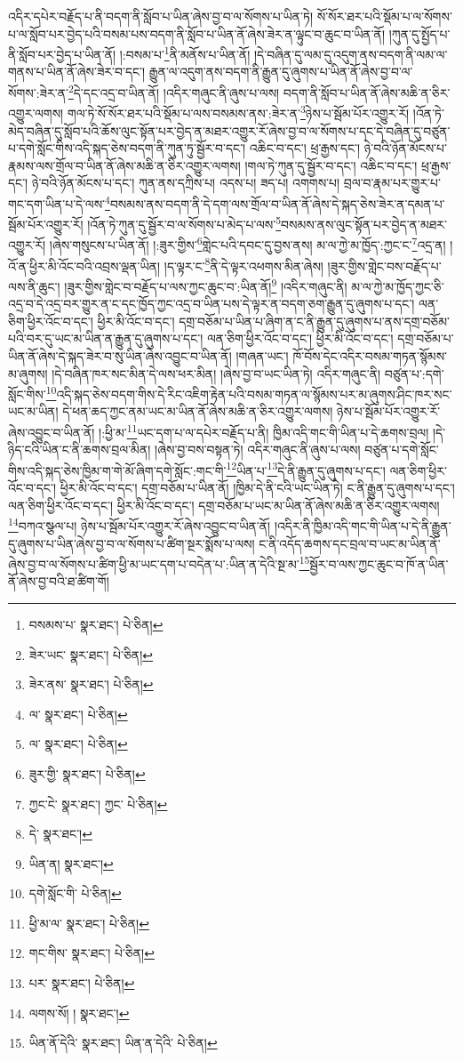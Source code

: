འདིར་དཔེར་བརྗོད་པ་ནི་བདག་ནི་སློབ་པ་ཡིན་ཞེས་བྱ་བ་ལ་སོགས་པ་ཡིན་ཏེ། སོ་སོར་ཐར་པའི་སྡོམ་པ་ལ་སོགས་པ་ལ་སློབ་པར་བྱེད་པའི་བསམ་པས་བདག་ནི་སློབ་པ་ཡིན་ནོ་ཞེས་ཟེར་ན་ལྟུང་བ་ཆུང་བ་ཡིན་ནོ། །ཀུན་དུ་སྤྱོད་པ་ནི་སློབ་པར་བྱེད་པ་ཡིན་ནོ། །:བསམ་པ་\footnote{བསམས་པ་  སྣར་ཐང་།  པེ་ཅིན། }ནི་མནོས་པ་ཡིན་ནོ། །དེ་བཞིན་དུ་ལམ་དུ་འདུག་ནས་བདག་ནི་ལམ་ལ་གནས་པ་ཡིན་ནོ་ཞེས་ཟེར་བ་དང་། རྒྱུན་ལ་འདུག་ནས་བདག་ནི་རྒྱུན་དུ་ཞུགས་པ་ཡིན་ནོ་ཞེས་བྱ་བ་ལ་སོགས་:ཟེར་ན་\footnote{ཟེར་ཡང་  སྣར་ཐང་།  པེ་ཅིན། }དེ་དང་འདྲ་བ་ཡིན་ནོ། །འདིར་གཞུང་ནི་ཞུས་པ་ལས། བདག་ནི་སློབ་པ་ཡིན་ནོ་ཞེས་མཆི་ན་ཅིར་འགྱུར་ལགས། གལ་ཏེ་སོ་སོར་ཐར་པའི་སྡོམ་པ་ལས་བསམས་ནས་:ཟེར་ན་\footnote{ཟེར་ནས་  སྣར་ཐང་།  པེ་ཅིན། }ཉེས་པ་སྦོམ་པོར་འགྱུར་རོ། །འོན་ཏེ་མེད་བཞིན་དུ་སློབ་པའི་ཆོས་ལུང་སྟོན་པར་བྱེད་ན་མཐར་འགྱུར་རོ་ཞེས་བྱ་བ་ལ་སོགས་པ་དང་དེ་བཞིན་དུ་བཙུན་པ་དགེ་སློང་གིས་འདི་སྐད་ཅེས་བདག་ནི་ཀུན་ཏུ་སྦྱོར་བ་དང་། འཆིང་བ་དང་། ཕྲ་རྒྱས་དང་། ཉེ་བའི་ཉོན་མོངས་པ་རྣམས་ལས་གྲོལ་བ་ཡིན་ནོ་ཞེས་མཆི་ན་ཅིར་འགྱུར་ལགས། །གལ་ཏེ་ཀུན་དུ་སྦྱོར་བ་དང་། འཆིང་བ་དང་། ཕྲ་རྒྱས་དང་། ཉེ་བའི་ཉོན་མོངས་པ་དང་། ཀུན་ནས་དཀྲིས་པ། འདས་པ། ཟད་པ། འགགས་པ། བྲལ་བ་རྣམ་པར་གྱུར་པ་གང་དག་ཡིན་པ་དེ་ལས་\footnote{ལ་  སྣར་ཐང་།  པེ་ཅིན། }བསམས་ནས་བདག་ནི་དེ་དག་ལས་གྲོལ་བ་ཡིན་ནོ་ཞེས་དེ་སྐད་ཅེས་ཟེར་ན་དམན་པ་སྦོམ་པོར་འགྱུར་རོ། །འོན་ཏེ་ཀུན་དུ་སྦྱོར་བ་ལ་སོགས་པ་མེད་པ་ལས་\footnote{ལ་  སྣར་ཐང་།  པེ་ཅིན། }བསམས་ནས་ལུང་སྟོན་པར་བྱེད་ན་མཐར་འགྱུར་རོ། །ཞེས་གསུངས་པ་ཡིན་ནོ། །:ཟུར་གྱིས་\footnote{ཟུར་གྱི་  སྣར་ཐང་།  པེ་ཅིན། }གླེང་པའི་དབང་དུ་བྱས་ནས། མ་ལ་ཀྱེ་མ་ཁྱོད་:ཀྱང་ང་\footnote{ཀྱང་ངེ་  སྣར་ཐང་། ཀྱང་  པེ་ཅིན། }འདྲ་ན། །འོ་ན་ཕྱིར་མི་འོང་བའི་འབྲས་ལྡན་ཡིན། །ད་ལྟར་ང་\footnote{དེ་  སྣར་ཐང་། }ནི་དེ་ལྟར་འཕགས་མིན་ཞེས། །ཟུར་གྱིས་གླེང་བས་བརྗོད་པ་ལས་ནི་ཆུང་། །ཟུར་གྱིས་གླེང་བ་བརྗོད་པ་ལས་ཀྱང་ཆུང་བ་:ཡིན་ནོ།\footnote{ཡིན་ན།  སྣར་ཐང་། } །འདིར་གཞུང་ནི། མ་ལ་ཀྱེ་མ་ཁྱོད་ཀྱང་ཅི་འདྲ་བ་དེ་འདྲ་བར་གྱུར་ན་ང་དང་ཁྱོད་ཀྱང་འདྲ་བ་ཡིན་པས་དེ་ལྟར་ན་བདག་ཅག་རྒྱུན་དུ་ཞུགས་པ་དང་། ལན་ཅིག་ཕྱིར་འོང་བ་དང་། ཕྱིར་མི་འོང་བ་དང་། དགྲ་བཅོམ་པ་ཡིན་པ་ཞིག་ན་ང་ནི་རྒྱུན་དུ་ཞུགས་པ་ནས་དགྲ་བཅོམ་པའི་བར་དུ་ཡང་མ་ཡིན་ན་རྒྱུན་དུ་ཞུགས་པ་དང་། ལན་ཅིག་ཕྱིར་འོང་བ་དང་། ཕྱིར་མི་འོང་བ་དང་། དགྲ་བཅོམ་པ་ཡིན་ནོ་ཞེས་དེ་སྐད་ཟེར་བ་སུ་ཡིན་ཞེས་འབྱུང་བ་ཡིན་ནོ། །གཞན་ཡང་། ཁོ་བོས་དེང་འདིར་བསམ་གཏན་སྙོམས་མ་ཞུགས། །དེ་བཞིན་ཁར་སང་མིན་དེ་ལས་ཕར་མིན། །ཞེས་བྱ་བ་ཡང་ཡིན་ཏེ། འདིར་གཞུང་ནི། བཙུན་པ་:དགེ་སློང་གིས་\footnote{དགེ་སློང་གི་  པེ་ཅིན། }འདི་སྐད་ཅེས་བདག་གིས་དེ་རིང་འཇིག་རྟེན་པའི་བསམ་གཏན་ལ་སྙོམས་པར་མ་ཞུགས་ཤིང་ཁར་སང་ཡང་མ་ཡིན། དེ་ཕན་ཆད་ཀྱང་ནམ་ཡང་མ་ཡིན་ནོ་ཞེས་མཆི་ན་ཅིར་འགྱུར་ལགས། ཉེས་པ་སྦོམ་པོར་འགྱུར་རོ་ཞེས་འབྱུང་བ་ཡིན་ནོ། །:ཕྱི་མ་\footnote{ཕྱི་མ་ལ་  སྣར་ཐང་།  པེ་ཅིན། }ཡང་དག་པ་ལ་དཔེར་བརྗོད་པ་ནི། ཁྱིམ་འདི་གང་གི་ཡིན་པ་དེ་ཆགས་བྲལ། །དེ་ཉིད་ངའི་ཡིན་ང་ནི་ཆགས་བྲལ་མིན། །ཞེས་བྱ་བས་བསྟན་ཏེ། འདིར་གཞུང་ནི་ཞུས་པ་ལས། བཙུན་པ་དགེ་སློང་གིས་འདི་སྐད་ཅེས་ཁྱིམ་ག་གེ་མོ་ཞིག་དགེ་སློང་:གང་གི་\footnote{གང་གིས་  སྣར་ཐང་།  པེ་ཅིན། }ཡིན་པ་\footnote{པར་  སྣར་ཐང་།  པེ་ཅིན། }དེ་ནི་རྒྱུན་དུ་ཞུགས་པ་དང་། ལན་ཅིག་ཕྱིར་འོང་བ་དང་། ཕྱིར་མི་འོང་བ་དང་། དགྲ་བཅོམ་པ་ཡིན་ནོ། །ཁྱིམ་དེ་ནི་ངའི་ཡང་ཡིན་ཏེ། ང་ནི་རྒྱུན་དུ་ཞུགས་པ་དང་། ལན་ཅིག་ཕྱིར་འོང་བ་དང་། ཕྱིར་མི་འོང་བ་དང་། དགྲ་བཅོམ་པ་ཡང་མ་ཡིན་ནོ་ཞེས་མཆི་ན་ཅིར་འགྱུར་ལགས། \footnote{ལགས་སོ། །   སྣར་ཐང་། }བཀའ་སྩལ་པ། ཉེས་པ་སྦོམ་པོར་འགྱུར་རོ་ཞེས་འབྱུང་བ་ཡིན་ནོ། །འདིར་ནི་ཁྱིམ་འདི་གང་གི་ཡིན་པ་དེ་ནི་རྒྱུན་དུ་ཞུགས་པ་ཡིན་ཞེས་བྱ་བ་ལ་སོགས་པ་ཚིག་སྔར་སྨོས་པ་ལས། ང་ནི་འདོད་ཆགས་དང་བྲལ་བ་ཡང་མ་ཡིན་ནོ་ཞེས་བྱ་བ་ལ་སོགས་པ་ཚིག་ཕྱི་མ་ཡང་དག་པ་བདེན་པ་:ཡིན་ན་དེའི་སྔ་མ་\footnote{ཡིན་ནོ་དེའི་  སྣར་ཐང་། ཡིན་ན་དེའི་  པེ་ཅིན། }སྦྱོར་བ་ལས་ཀྱང་ཆུང་བ་ཁོ་ན་ཡིན་ནོ་ཞེས་བྱ་བའི་ཐ་ཚིག་གོ། 